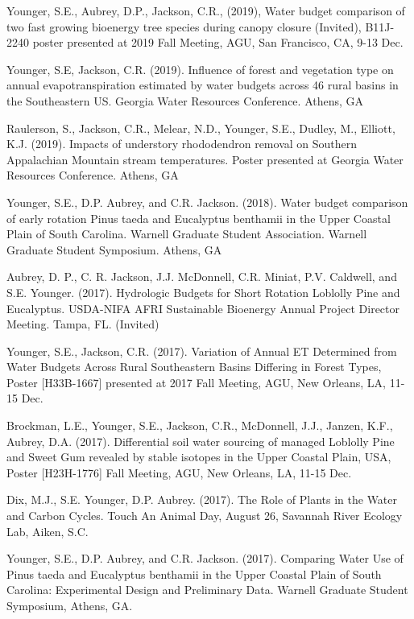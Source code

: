 \documentclass[10pt,letterpaper]{article}
\begin{document}
\begin{hangparas}{.25in}{1}
	
	Younger, S.E., Aubrey, D.P., Jackson, C.R., (2019), Water budget comparison of two fast growing bioenergy tree species during canopy closure (Invited), B11J-2240 poster presented at 2019 Fall Meeting, AGU, San Francisco, CA, 9-13 Dec.
	
	Younger, S.E, Jackson, C.R. (2019). Influence of forest and vegetation type on annual evapotranspiration estimated by water budgets across 46 rural basins in the Southeastern US. Georgia Water Resources Conference. Athens, GA
	
	Raulerson, S., Jackson, C.R., Melear, N.D., Younger, S.E., Dudley, M., Elliott, K.J. (2019). Impacts of understory rhododendron removal on Southern Appalachian Mountain stream temperatures. Poster presented at Georgia Water Resources Conference. Athens, GA
	
	Younger, S.E., D.P. Aubrey, and C.R. Jackson. (2018). Water budget comparison of early rotation Pinus taeda and Eucalyptus benthamii in the Upper Coastal Plain of South Carolina. Warnell Graduate Student Association. Warnell Graduate Student Symposium. Athens, GA
	
	Aubrey, D. P., C. R. Jackson, J.J. McDonnell, C.R. Miniat, P.V. Caldwell, and S.E. Younger. (2017). Hydrologic Budgets for Short Rotation Loblolly Pine and Eucalyptus. USDA-NIFA AFRI Sustainable Bioenergy Annual Project Director Meeting. Tampa, FL. (Invited)
	
	Younger, S.E., Jackson, C.R. (2017). Variation of Annual ET Determined from Water Budgets Across Rural Southeastern Basins Differing in Forest Types, Poster [H33B-1667] presented at 2017 Fall Meeting, AGU, New Orleans, LA, 11-15 Dec.
	
	Brockman, L.E., Younger, S.E., Jackson, C.R., McDonnell, J.J., Janzen, K.F., Aubrey, D.A. (2017). Differential soil water sourcing of managed Loblolly Pine and Sweet Gum revealed by stable isotopes in the Upper Coastal Plain, USA, Poster [H23H-1776] Fall Meeting, AGU, New Orleans, LA, 11-15 Dec.
	
	Dix, M.J., S.E. Younger, D.P. Aubrey. (2017). The Role of Plants in the Water and Carbon Cycles. Touch An Animal Day, August 26, Savannah River Ecology Lab, Aiken, S.C.
	
	Younger, S.E., D.P. Aubrey, and C.R. Jackson. (2017). Comparing Water Use of Pinus taeda and Eucalyptus benthamii in the Upper Coastal Plain of South Carolina: Experimental Design and Preliminary Data. Warnell Graduate Student Symposium, Athens, GA. 
	

\end{hangparas}
\end{document}
